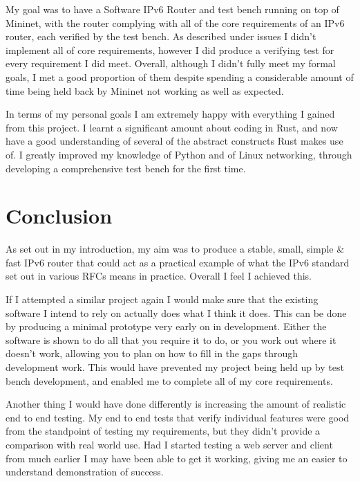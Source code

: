 \documentclass[12pt,a4paper,twoside,openright]{report}
\begin{document}
My goal was to have a Software IPv6 Router and test bench running on top of Mininet, with the router complying with all of the core requirements of an IPv6 router, each verified by the test bench.  As described under issues I didn't implement all of core requirements, however I did produce a verifying test for every requirement I did meet.  Overall, although I didn't fully meet my formal goals, I met a good proportion of them despite spending a considerable amount of time being held back by Mininet not working as well as expected.

\bigskip

In terms of my personal goals I am extremely happy with everything I gained from this project.  I learnt a significant amount about coding in Rust, and now have a good understanding of several of the abstract constructs Rust makes use of.  I greatly improved my knowledge of Python and of Linux networking, through developing a comprehensive test bench for the first time.


\chapter{Conclusion}

As set out in my introduction, my aim was to produce a stable, small, simple \& fast IPv6 router that could act as a practical example of what the IPv6 standard set out in various RFCs means in practice.  Overall I feel I achieved this.

\bigskip

If I attempted a similar project again I would make sure that the existing software I intend to rely on actually does what I think it does.  This can be done by producing a minimal prototype very early on in development.  Either the software is shown to do all that you require it to do, or you work out where it doesn't work, allowing you to plan on how to fill in the gaps through development work.  This would have prevented my project being held up by test bench development, and enabled me to complete all of my core requirements.

\bigskip

Another thing I would have done differently is increasing the amount of realistic end to end testing.  My end to end tests that verify individual features were good from the standpoint of testing my requirements, but they didn't provide a comparison with real world use.  Had I started testing a web server and client from much earlier I may have been able to get it working, giving me an easier to understand demonstration of success.
\end{document}
